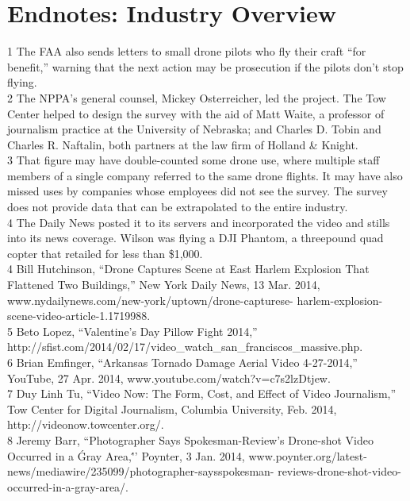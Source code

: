 \section{Endnotes: Industry Overview}
1 The FAA also sends letters to small drone pilots who fly their craft ``for benefit,'' warning that the
next action may be prosecution if the pilots don't stop flying.\\
2 The NPPA's general counsel, Mickey Osterreicher, led the project. The Tow Center helped to
design the survey with the aid of Matt Waite, a professor of journalism practice at the University
of Nebraska; and Charles D. Tobin and Charles R. Naftalin, both partners at the law firm of
Holland & Knight.\\
3 That figure may have double-counted some drone use, where multiple staff members of a single
company referred to the same drone flights. It may have also missed uses by companies whose
employees did not see the survey. The survey does not provide data that can be extrapolated to the
entire industry.\\
4 The Daily News posted it to its servers and incorporated the video and
stills into its news coverage. Wilson was flying a DJI Phantom, a threepound
quad copter that retailed for less than \$1,000.\\
4 Bill Hutchinson, ``Drone Captures Scene at East Harlem Explosion That Flattened Two Buildings,''
New York Daily News, 13 Mar. 2014, www.nydailynews.com/new-york/uptown/drone-capturese-
harlem-explosion-scene-video-article-1.1719988.\\
5 Beto Lopez, ``Valentine's Day Pillow Fight 2014,'' http://sfist.com/2014/02/17/video_watch_san_franciscos_massive.php.\\
6 Brian Emfinger, ``Arkansas Tornado Damage Aerial Video 4-27-2014,'' YouTube, 27 Apr. 2014,
www.youtube.com/watch?v=c7s2lzDtjew.\\
7 Duy Linh Tu, ``Video Now: The Form, Cost, and Effect of Video Journalism,'' Tow Center for
Digital Journalism, Columbia University, Feb. 2014, http://videonow.towcenter.org/.\\
8 Jeremy Barr, ``Photographer Says Spokesman-Review's Drone-shot Video Occurred in a \'Gray Area,\'
'' Poynter, 3 Jan. 2014, www.poynter.org/latest-news/mediawire/235099/photographer-saysspokesman-
reviews-drone-shot-video-occurred-in-a-gray-area/.\\

